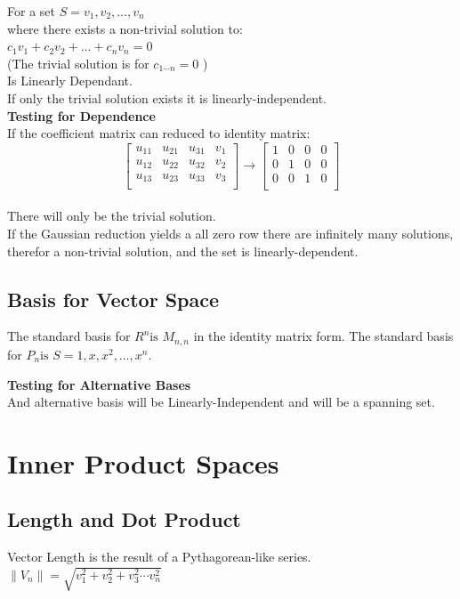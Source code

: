 \documentclass[]{article}
\begin{document}
For a set $S = {v_1, v_2, \ldots, v_n}$ \\
where there exists a non-trivial solution to: \\
$ c_1v_1 + c_2v_2 + \ldots + c_nv_n = 0 $ \\
(The trivial solution is for $c_{1 \cdots n}=0$ )\\
Is Linearly Dependant. \\
If only the trivial solution exists it is linearly-independent. \\
\textbf{Testing for Dependence} \\
If the coefficient matrix can reduced to identity matrix: \\
$$\begin{bmatrix}
	u_{11} & u_{21} & u_{31} & v_1 \\
	u_{12} & u_{22} & u_{32} & v_2 \\
	u_{13} & u_{23} & u_{33} & v_3 \\
\end{bmatrix} 
\rightarrow
\begin{bmatrix}
	1 & 0 & 0 & 0 \\
	0 & 1 & 0 & 0 \\
	0 & 0 & 1 & 0 \\
\end{bmatrix}$$ \\
There will only be the trivial solution. \\
If the Gaussian reduction yields a all zero row there are infinitely many solutions, therefor a non-trivial solution, and the set is linearly-dependent.

\subsection{Basis for Vector Space}
The standard basis for $R^n \text{is } M_{n,n} $ in the identity matrix form.
The standard basis for $P_n \text{is } S={1,x,x^2,\ldots,x^n} $.

\textbf{Testing for Alternative Bases} \\
And alternative basis will be Linearly-Independent
and will be a spanning set. \\

\section{Inner Product Spaces}

\subsection{Length and Dot Product}
Vector Length is the result of a Pythagorean-like series. \\
$\left\|V_n\right\| =\sqrt{v_1^2 + v_2^2 + v_3^2 \cdots v_n^2}$ \\
\end{document}
